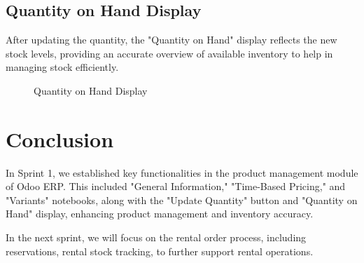 \subsection{Quantity on Hand Display}
After updating the quantity, the "Quantity on Hand" display reflects the new stock levels, providing an accurate overview of available inventory to help in managing stock efficiently.
\begin{figure}[h]
    \centering
    \caption{Quantity on Hand Display}
    \label{fig:quantity_on_hand}
\end{figure}

\section*{Conclusion}
In Sprint 1, we established key functionalities in the product management module of Odoo ERP. This included "General Information," "Time-Based Pricing," and "Variants" notebooks, along with the "Update Quantity" button and "Quantity on Hand" display, enhancing product management and inventory accuracy.

In the next sprint, we will focus on the rental order process, including reservations, rental stock tracking, to further support rental operations.